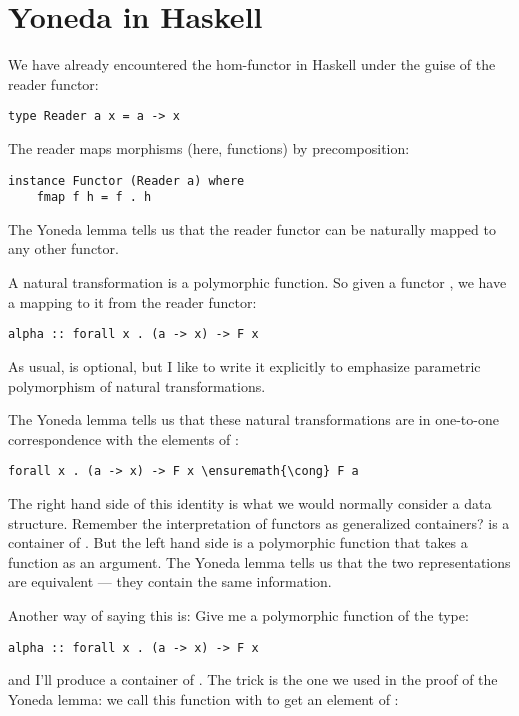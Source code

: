 \section{Yoneda in Haskell}\label{yoneda-in-haskell}

We have already encountered the hom-functor in Haskell under the guise
of the reader functor:

\begin{Verbatim}[commandchars=\\\{\}]
type Reader a x = a -> x
\end{Verbatim}
The reader maps morphisms (here, functions) by precomposition:

\begin{Verbatim}[commandchars=\\\{\}]
instance Functor (Reader a) where
    fmap f h = f . h
\end{Verbatim}
The Yoneda lemma tells us that the reader functor can be naturally
mapped to any other functor.

A natural transformation is a polymorphic function. So given a functor
, we have a mapping to it from the reader functor:

\begin{Verbatim}[commandchars=\\\{\}]
alpha :: forall x . (a -> x) -> F x
\end{Verbatim}
As usual,  is optional, but I like to write it explicitly
to emphasize parametric polymorphism of natural transformations.

The Yoneda lemma tells us that these natural transformations are in
one-to-one correspondence with the elements of :

\begin{Verbatim}[commandchars=\\\{\}]
forall x . (a -> x) -> F x \ensuremath{\cong} F a
\end{Verbatim}
The right hand side of this identity is what we would normally consider
a data structure. Remember the interpretation of functors as generalized
containers?  is a container of . But the left
hand side is a polymorphic function that takes a function as an
argument. The Yoneda lemma tells us that the two representations are
equivalent --- they contain the same information.

Another way of saying this is: Give me a polymorphic function of the
type:

\begin{Verbatim}[commandchars=\\\{\}]
alpha :: forall x . (a -> x) -> F x
\end{Verbatim}
and I'll produce a container of . The trick is the one we used
in the proof of the Yoneda lemma: we call this function with 
to get an element of :

